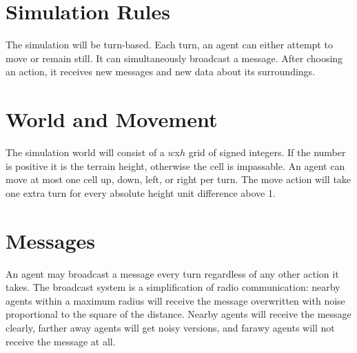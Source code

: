\section{Simulation Rules}

The simulation will be turn-based. Each turn, an agent can either attempt to move or remain still. It can simultaneously broadcast a message. After choosing an action, it receives new messages and new data about its surroundings.

\section{World and Movement}

The simulation world will consist of a $w$x$h$ grid of signed integers. If the number is positive it is the terrain height, otherwise the cell is impassable. An agent can move at most one cell up, down, left, or right per turn. The move action will take one extra turn for every absolute height unit difference above 1.

\section{Messages}

An agent may broadcast a message every turn regardless of any other action it takes. The broadcast system is a simplification of radio communication: nearby agents within a maximum radius will receive the message overwritten with noise proportional to the square of the distance. Nearby agents will receive the message clearly, farther away agents will get noisy versions, and farawy agents will not receive the message at all.